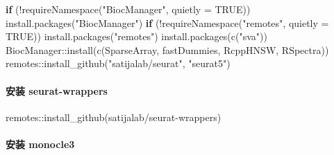 \documentclass[
]{article}
\newenvironment{Shaded}{\begin{snugshade}}{\end{snugshade}}
\newcommand{\AttributeTok}[1]{\textcolor[rgb]{0.77,0.63,0.00}{#1}}
\newcommand{\ConstantTok}[1]{\textcolor[rgb]{0.00,0.00,0.00}{#1}}
\newcommand{\ControlFlowTok}[1]{\textcolor[rgb]{0.13,0.29,0.53}{\textbf{#1}}}
\newcommand{\FunctionTok}[1]{\textcolor[rgb]{0.00,0.00,0.00}{#1}}
\newcommand{\NormalTok}[1]{#1}
\newcommand{\SpecialCharTok}[1]{\textcolor[rgb]{0.00,0.00,0.00}{#1}}
\newcommand{\StringTok}[1]{\textcolor[rgb]{0.31,0.60,0.02}{#1}}
\begin{document}
\begin{Shaded}
\begin{Highlighting}[]
\ControlFlowTok{if}\NormalTok{ (}\SpecialCharTok{!}\FunctionTok{requireNamespace}\NormalTok{(}\StringTok{"BiocManager"}\NormalTok{, }\AttributeTok{quietly =} \ConstantTok{TRUE}\NormalTok{))}
    \FunctionTok{install.packages}\NormalTok{(}\StringTok{"BiocManager"}\NormalTok{)}
\ControlFlowTok{if}\NormalTok{ (}\SpecialCharTok{!}\FunctionTok{requireNamespace}\NormalTok{(}\StringTok{"remotes"}\NormalTok{, }\AttributeTok{quietly =} \ConstantTok{TRUE}\NormalTok{))}
    \FunctionTok{install.packages}\NormalTok{(}\StringTok{"remotes"}\NormalTok{)}
\FunctionTok{install.packages}\NormalTok{(}\FunctionTok{c}\NormalTok{(}\StringTok{"sva"}\NormalTok{))}
\NormalTok{BiocManager}\SpecialCharTok{::}\FunctionTok{install}\NormalTok{(}\FunctionTok{c}\NormalTok{(}\StringTok{\textquotesingle{}SparseArray\textquotesingle{}}\NormalTok{, }\StringTok{\textquotesingle{}fastDummies\textquotesingle{}}\NormalTok{, }\StringTok{\textquotesingle{}RcppHNSW\textquotesingle{}}\NormalTok{, }\StringTok{\textquotesingle{}RSpectra\textquotesingle{}}\NormalTok{))}
\NormalTok{remotes}\SpecialCharTok{::}\FunctionTok{install\_github}\NormalTok{(}\StringTok{"satijalab/seurat"}\NormalTok{, }\StringTok{"seurat5"}\NormalTok{)}
\end{Highlighting}
\end{Shaded}

\hypertarget{ux5b89ux88c5-seurat-wrappers}{%
\paragraph{安装 seurat-wrappers}\label{ux5b89ux88c5-seurat-wrappers}}

\begin{Shaded}
\begin{Highlighting}[]
\NormalTok{remotes}\SpecialCharTok{::}\FunctionTok{install\_github}\NormalTok{(}\StringTok{\textquotesingle{}satijalab/seurat{-}wrappers\textquotesingle{}}\NormalTok{)}
\end{Highlighting}
\end{Shaded}

\hypertarget{ux5b89ux88c5-monocle3}{%
\paragraph{安装 monocle3}\label{ux5b89ux88c5-monocle3}}
\end{document}
